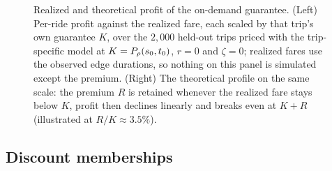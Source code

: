 \documentclass[12pt]{article}
\begin{document}
{{{{{{{{\begin{figure}[h!]
\caption{Realized and theoretical profit of the on-demand guarantee. (Left) Per-ride profit
against the realized fare, each scaled by that trip's own guarantee $K$, over the $2{,}000$
held-out trips priced with the trip-specific model at $K = P_\rho({s_0},t_0)$, $r=0$ and
$\zeta=0$; realized fares use the observed edge durations, so nothing on this panel is
simulated except the premium. (Right) The theoretical profile on the same scale: the premium
$R$ is retained whenever the realized fare stays below $K$, profit then declines linearly and
breaks even at $K+R$ (illustrated at $R/K \approx 3.5\%$).}
\label{fig:profit_loss}
\end{figure}


\subsection{Discount memberships}\label{sec:discount-analysis}

}}}}}}}}
\end{document}

